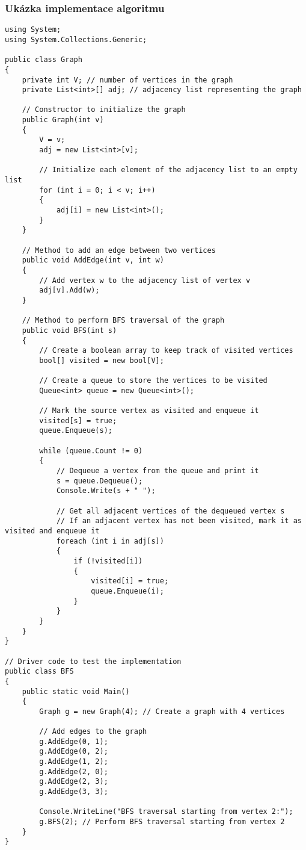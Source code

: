 \documentclass[12pt, titlepage, a4paper]{article}
\begin{document}
\subsubsection{Ukázka implementace algoritmu}

\begin{lstlisting}
using System;
using System.Collections.Generic;

public class Graph
{
    private int V; // number of vertices in the graph
    private List<int>[] adj; // adjacency list representing the graph

    // Constructor to initialize the graph
    public Graph(int v)
    {
        V = v;
        adj = new List<int>[v];

        // Initialize each element of the adjacency list to an empty list
        for (int i = 0; i < v; i++)
        {
            adj[i] = new List<int>();
        }
    }

    // Method to add an edge between two vertices
    public void AddEdge(int v, int w)
    {
        // Add vertex w to the adjacency list of vertex v
        adj[v].Add(w);
    }

    // Method to perform BFS traversal of the graph
    public void BFS(int s)
    {
        // Create a boolean array to keep track of visited vertices
        bool[] visited = new bool[V];

        // Create a queue to store the vertices to be visited
        Queue<int> queue = new Queue<int>();

        // Mark the source vertex as visited and enqueue it
        visited[s] = true;
        queue.Enqueue(s);

        while (queue.Count != 0)
        {
            // Dequeue a vertex from the queue and print it
            s = queue.Dequeue();
            Console.Write(s + " ");

            // Get all adjacent vertices of the dequeued vertex s
            // If an adjacent vertex has not been visited, mark it as visited and enqueue it
            foreach (int i in adj[s])
            {
                if (!visited[i])
                {
                    visited[i] = true;
                    queue.Enqueue(i);
                }
            }
        }
    }
}

// Driver code to test the implementation
public class BFS
{
    public static void Main()
    {
        Graph g = new Graph(4); // Create a graph with 4 vertices

        // Add edges to the graph
        g.AddEdge(0, 1);
        g.AddEdge(0, 2);
        g.AddEdge(1, 2);
        g.AddEdge(2, 0);
        g.AddEdge(2, 3);
        g.AddEdge(3, 3);

        Console.WriteLine("BFS traversal starting from vertex 2:");
        g.BFS(2); // Perform BFS traversal starting from vertex 2
    }
}
\end{lstlisting}
~\cite{GeeksforGeeks: BFS}
\clearpage
\end{document}
